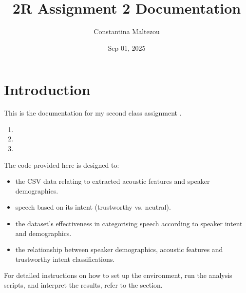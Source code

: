 \documentclass[letterpaper,10pt,english]{sphinxhowto}
\title{2R Assignment 2 Documentation}
\date{Sep 01, 2025}
\author{Constantina Maltezou}
\begin{document}
\pagestyle{empty}
\sphinxmaketitle
\pagestyle{plain}

\pagestyle{normal}
\label{\detokenize{index::doc}}



\section{Introduction}
\label{\detokenize{index:introduction}}
\sphinxAtStartPar
This is the documentation for my second class assignment .
\begin{enumerate}
%
\item {} 
\sphinxAtStartPar
{}

\item {} 
\sphinxAtStartPar
{}

\item {} 
\sphinxAtStartPar
{}

\end{enumerate}

\sphinxAtStartPar
The code provided here is designed to:
\begin{itemize}
\item {} 
\sphinxAtStartPar
{} the CSV data relating to extracted acoustic features and speaker demographics.

\item {} 
\sphinxAtStartPar
{} speech based on its intent (trustworthy vs. neutral).

\item {} 
\sphinxAtStartPar
{} the dataset’s effectiveness in categorising speech according to speaker intent and demographics.

\item {} 
\sphinxAtStartPar
{} the relationship between speaker demographics, acoustic features and trustworthy intent classifications.

\end{itemize}

\sphinxAtStartPar
For detailed instructions on how to set up the environment, run the analysis scripts, and interpret the results,
refer to the  section.
\end{document}

